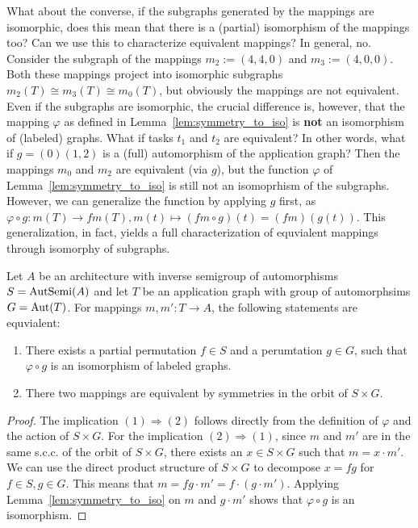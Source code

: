 What about the converse, if the subgraphs generated by the mappings are isomorphic, does this mean that there is a (partial) isomorphism of the mappings too? Can we use this to characterize equivalent mappings? 
In general, no.
Consider the subgraph of the mappings $m_2 := (4,4,0)$ and $m_3 := (4,0,0)$. Both these mappings project into isomorphic subgraphs $m_2(T) \cong m_3(T) \cong m_0(T)$, but obviously the mappings are not equivalent.
Even if the subgraphs are isomorphic, the crucial difference is, however, that the mapping $\varphi$ as defined in Lemma~\ref{lem:symmetry_to_iso} is \textbf{not} an isomorphism of (labeled) graphs. 
What if tasks $t_1$ and $t_2$ are equivalent?
In other words,  what if $g = (0)(1,2)$ is a (full) automorphism of the application graph?
Then the mappings $m_0$ and $m_2$ are equivalent (via $g$), but the function $\varphi$ of Lemma~\ref{lem:symmetry_to_iso} is still not an isomoprhism of the subgraphs.
However, we can generalize the function by applying $g$ first, as $\varphi \circ g : m(T) \rightarrow fm(T), m(t) \mapsto (fm \circ g)(t) = (fm)(g(t))$.
This generalization, in fact, yields a full characterization of equvialent mappings through isomorphy of subgraphs.
\begin{theorem}
Let $A$ be an architecture with inverse semigroup of automorphisms $S = \operatorname{AutSemi}(A)$ and let $T$ be an application graph with group of automorphsims $G = \operatorname{Aut}(T)$.
For mappings $m,m' : T \rightarrow A$, the following statements are equvialent:
\begin{enumerate}
\item There exists a partial permutation $f \in S$ and a perumtation $g \in G$, such that $\varphi \circ g$ is an isomorphism of labeled graphs.
\item There two mappings are equivalent by symmetries in the orbit of $S \times G$.
\end{enumerate}
\begin{proof}
The implication $(1) \Rightarrow (2)$ follows directly from the definition of $\varphi$ and the action of $S \times G$.
For the implication $(2) \Rightarrow (1)$, since $m$ and $m'$ are in the same s.c.c. of the orbit of $S \times G$, there exists an $x \in S \times G$ such that $m = x \cdot m'$.
We can use the direct product structure of $S \times G$ to decompose $ x = fg$ for $f \in S, g \in G$.
This means that $m = fg \cdot m' = f \cdot (g \cdot m')$.
Applying Lemma~\ref{lem:symmetry_to_iso} on $m$ and $g \cdot m'$ shows that $\varphi \circ g$ is an isomorphism.
\end{proof}
\end{theorem}

